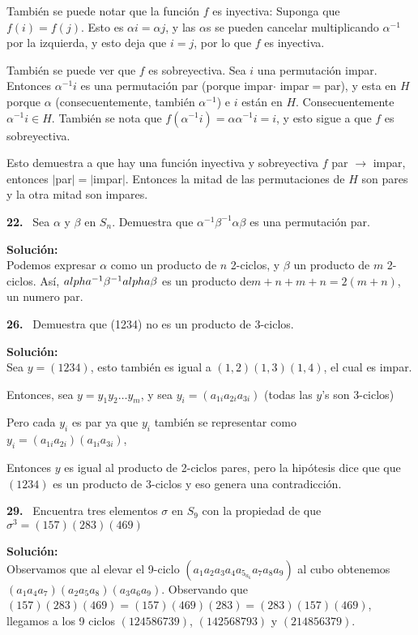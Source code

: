 \documentclass{article}
\newcounter{problem}
\newcounter{solution}
\newcommand\Problem[1]{%
  \stepcounter{problem}%
  \textbf{#1.}~%
  \setcounter{solution}{0}%
}
\newcommand\TheSolution{%
  \textbf{Solución:}\\%
}
\begin{document}
Tambi\'en se puede notar que la funci\'on $f$ es inyectiva: Suponga que
$f(i) = f(j)$. Esto es $\alpha i = \alpha j$, y las $\alpha$s se pueden
cancelar multiplicando $\alpha^{-1}$ por la izquierda, y esto deja que $i=j$,
por lo que $f$ es inyectiva.

También se puede ver que $f$ es sobreyectiva. Sea $i$ una permutación
impar. Entonces $\alpha^{-1}i$ es una permutación par (porque impar$\cdot$
impar$=$par), y esta en $H$ porque $\alpha$ (consecuentemente, también $\alpha
^{-1}$) e $i$ están en $H$. Consecuentemente $\alpha^{-1}i \in H$. También
se nota que $f(\alpha^{-1}i) = \alpha\alpha^{-1}i = i$, y esto sigue a que $f$
es sobreyectiva.

Esto demuestra a que hay una función inyectiva y sobreyectiva $f$ par
$\rightarrow $ impar, entonces $|$par$|=|$impar$|$. Entonces la mitad de las
permutaciones de $H$ son pares y la otra mitad son impares.

\Problem{22} Sea $\alpha$ y $\beta$ en $S_n$. Demuestra que $\alpha^{-1}\beta
^{-1}\alpha\beta$ es una permutación par.

\TheSolution{} Podemos expresar $\alpha$ como un producto de $n$ 2-ciclos, y
$\beta$ un producto de $m$ 2-ciclos. Así, $\\alpha^{-1}\beta^{-1}alpha\beta$
es un producto de$m + n + m + n = 2(m + n)$, un numero par.

\Problem{26} Demuestra que (1234) no es un producto de 3-ciclos.

\TheSolution{}
Sea $y=(1234)$, esto también es igual a $(1,2)(1,3)(1,4)$, el cual es impar.

Entonces, sea $y = y_1y_2\dots y_m$, y sea $y_i = (a_{1i}a_{2i}a_{3i})$ (todas
las $y$'s son 3-ciclos)

Pero cada $y_i$ es par ya que $y_i$ tambi\'en se representar como $y_i = (a_
{1i}a_{2i})(a_{1i}a_{3i})$,

Entonces $y$ es igual al producto de 2-ciclos pares, pero la hip\'otesis dice
que que $(1234)$ es un producto de 3-ciclos y eso genera una contradicci\'on.


\Problem{29} Encuentra tres elementos $\sigma$ en $S_9$ con la propiedad de
que $\sigma^3 = (157)(283)(469)$

\TheSolution{} Observamos que al elevar el 9-ciclo $(a_1 a_2 a_3 a_4 a_5_ a_6
a_7 a_8 a_9)$ al cubo obtenemos $(a_1 a_4 a_7)(a_2 a_5 a_8)(a_3 a_6 a_9)$.
Observando que $(157)(283)(469) = (157)(469)(283) = (283)(157)(469)$, llegamos
a los 9 ciclos $(124586739)$, $(142568793)$ y $(214856379)$.
\end{document}
